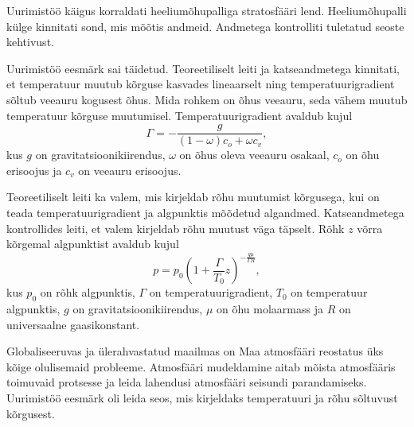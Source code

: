 \documentclass{trkut}%
\begin{document}
Uurimistöö käigus korraldati heeliumõhupalliga stratosfääri lend. Heeliumõhupalli külge kinnitati sond, mis mõõtis andmeid. Andmetega kontrolliti tuletatud seoste kehtivust.

Uurimistöö eesmärk sai täidetud. Teoreetiliselt leiti ja katseandmetega kinnitati, et temperatuur muutub kõrguse kasvades lineaarselt ning temperatuurigradient sõltub veeauru kogusest õhus. Mida rohkem on õhus veeauru, seda vähem muutub temperatuur kõrguse muutumisel. Temperatuurigradient avaldub kujul
\begin{equation*}
	\Gamma = -\frac{g}{(1-\omega)c_{o} + \omega c_{v}} ,
\end{equation*}
kus $g$ on gravitatsioonikiirendus, $\omega$ on õhus oleva veeauru osakaal, $c_o$ on õhu erisoojus ja $c_v$ on veeauru erisoojus.

Teoreetiliselt leiti ka valem, mis kirjeldab rõhu muutumist kõrgusega, kui on teada temperatuurigradient ja algpunktis mõõdetud algandmed. Katseandmetega kontrollides leiti, et valem kirjeldab rõhu muutust väga täpselt. Rõhk $z$ võrra kõrgemal algpunktist avaldub kujul 
\begin{equation*}
	p=p_0 \left(1+\frac{\Gamma}{T_0}z\right)^{ -\frac{g\mu}{\Gamma R}} ,
\end{equation*}
kus $p_0$ on rõhk algpunktis, $\Gamma$ on temperatuurigradient, $T_0$ on temperatuur algpunktis, $g$ on gravitatsioonikiirendus, $\mu$ on õhu molaarmass ja $R$ on universaalne gaasikonstant.




\printbibliography

\scriptsize

\normalsize

\scriptsize

\normalsize

\scriptsize

\normalsize

\scriptsize
%
\normalsize


\kinnitusleht%


Globaliseeruvas ja ülerahvastatud maailmas on Maa atmosfääri reostatus üks kõige olulisemaid probleeme. Atmosfääri mudeldamine aitab mõista atmosfääris toimuvaid protsesse ja leida lahendusi atmosfääri seisundi parandamiseks. Uurimistöö eesmärk oli leida seos, mis kirjeldaks temperatuuri ja rõhu sõltuvust kõrgusest.
\end{document}

